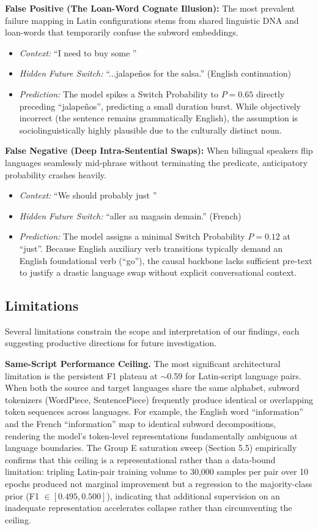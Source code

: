 \documentclass[sigconf,nonacm]{acmart}
\begin{document}
\textbf{False Positive (The Loan-Word Cognate Illusion):}
The most prevalent failure mapping in Latin configurations stems from shared linguistic DNA and loan-words that temporarily confuse the subword embeddings.
\begin{itemize}
    \item \textit{Context:} ``I need to buy some ''
    \item \textit{Hidden Future Switch:} ``...jalapeños for the salsa.'' (English continuation)
    \item \textit{Prediction:} The model spikes a Switch Probability to \( P = 0.65 \) directly preceding ``jalapeños'', predicting a small duration burst. While objectively incorrect (the sentence remains grammatically English), the assumption is sociolinguistically highly plausible due to the culturally distinct noun.
\end{itemize}

\textbf{False Negative (Deep Intra-Sentential Swaps):}
When bilingual speakers flip languages seamlessly mid-phrase without terminating the predicate, anticipatory probability crashes heavily.
\begin{itemize}
    \item \textit{Context:} ``We should probably just ''
    \item \textit{Hidden Future Switch:} ``aller au magasin demain.'' (French)
    \item \textit{Prediction:} The model assigns a minimal Switch Probability \( P = 0.12 \) at ``just''. Because English auxiliary verb transitions typically demand an English foundational verb (``go''), the causal backbone lacks sufficient pre-text to justify a drastic language swap without explicit conversational context.

\end{itemize}

\subsection{Limitations}
Several limitations constrain the scope and interpretation of our findings, each suggesting productive directions for future investigation.

\textbf{Same-Script Performance Ceiling.} The most significant architectural limitation is the persistent F1 plateau at $\sim$0.59 for Latin-script language pairs. When both the source and target languages share the same alphabet, subword tokenizers (WordPiece, SentencePiece) frequently produce identical or overlapping token sequences across languages. For example, the English word ``information'' and the French ``information'' map to identical subword decompositions, rendering the model's token-level representations fundamentally ambiguous at language boundaries. The Group E saturation sweep (Section 5.5) empirically confirms that this ceiling is a representational rather than a data-bound limitation: tripling Latin-pair training volume to 30{,}000 samples per pair over 10 epochs produced not marginal improvement but a regression to the majority-class prior (F1 $\in [0.495, 0.500]$), indicating that additional supervision on an inadequate representation accelerates collapse rather than circumventing the ceiling.
\end{document}
